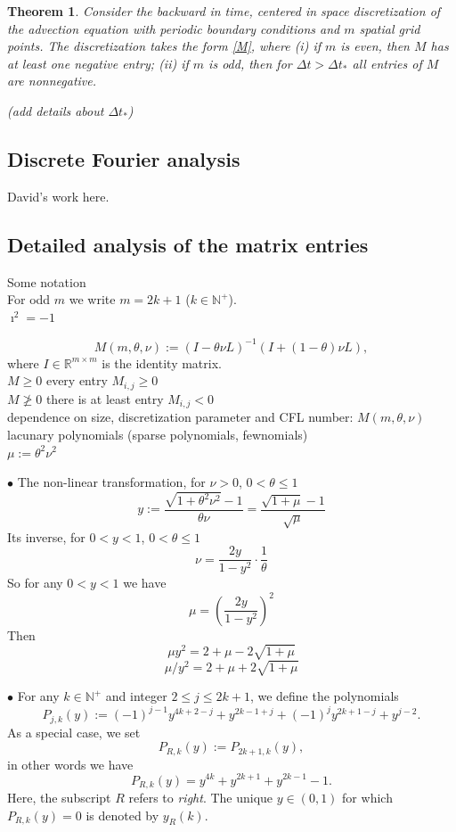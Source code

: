 \documentclass[a4paper]{article}
\newtheorem{theorem}{Theorem}
\newcommand{\dt}{\Delta t}
\newcommand{\te}{\theta}
\newcommand{\yr}{y_R(k)}
\newcommand{\nplus}{\mathbb{N}^+}
\newcommand{\rr}{\mathbb{R}}
\newcommand{\Por}{P_{R,k}(y)}
\begin{document}
\begin{theorem}
Consider the backward in time, centered in space discretization of the
advection equation with periodic boundary conditions and $m$ spatial grid
points.  The discretization takes the form \eqref{M},
where (i) if $m$ is even, then $M$ has at least one negative entry;
(ii) if $m$ is odd, then for $\dt>\dt_*$ all entries of $M$ are nonnegative.

(add details about $\dt_*$)
\end{theorem}

\subsection{Discrete Fourier analysis}
David's work here.

\subsection{Detailed analysis of the matrix entries}
Some notation \\

For odd $m$ we write $m=2k+1$ ($k\in\nplus$).\\

$\imath^2=-1$ 

\[
M(m,\te,\nu):=(I-\te\nu L)^{-1}(I+(1-\te)\nu L),
\]
where $I\in\rr^{m\times m}$ is the identity matrix.\\

$M\ge 0$ every entry $M_{i,j}\ge 0$\\

$M\not\ge 0$ there is at least entry $M_{i,j}<0$\\

dependence on size, discretization parameter and CFL number: $M(m,\te,\nu)$\\

lacunary polynomials (sparse polynomials, fewnomials)\\

$\mu:=\te^2\nu^2$

$\bullet$ The non-linear transformation, for $\nu>0$, $0<\te\le 1$
\[
y:=\frac{\sqrt{1+\te^2\nu^2}-1}{\te\nu}=\frac{\sqrt{1+\mu}-1}{\sqrt{\mu}}
\]
Its inverse, for $0<y<1$, $0<\te\le 1$
\[
\nu=\frac{2y}{1-y^2}\cdot\frac{1}{\te}
\]
So for any $0<y<1$ we have
\[
\mu=\left(\frac{2y}{1-y^2}\right)^2
\]
Then
\[\mu y^2=2+\mu-2\sqrt{1+\mu}\]
\[\mu/y^2=2+\mu+2\sqrt{1+\mu}\]

$\bullet$ For any $k\in\nplus$ and integer $2\le j\le 2k+1$, we define the polynomials
\[
P_{j,k}(y):=(-1)^{j-1} y^{4 k+2-j}+y^{2 k-1+j}+(-1)^j y^{2 k+1-j}+y^{j-2}.
\]
As a special case, we set
\[
\Por:=P_{2k+1,k}(y),
\]
in other words we have
\[\Por=y^{4 k}+y^{2 k+1}+y^{2 k-1}-1.\]
Here, the subscript $R$ refers to \textit{right}.
The unique $y\in(0,1)$ for which $\Por=0$ is denoted by $\yr$. 
\end{document}
